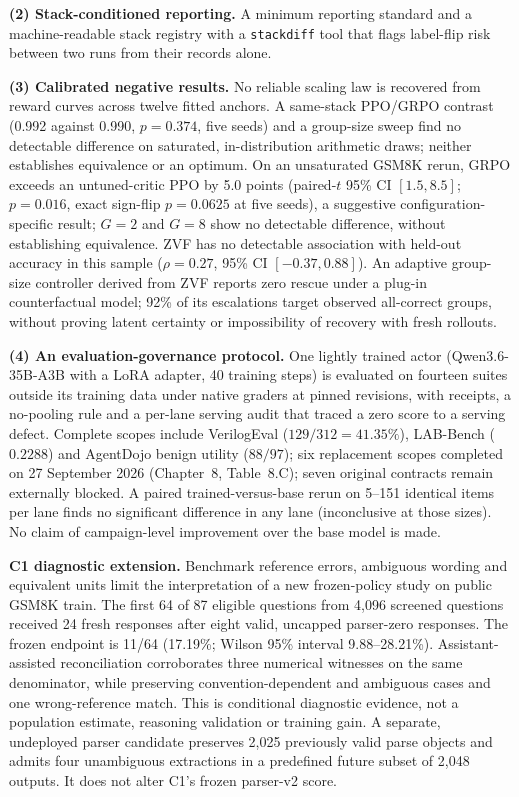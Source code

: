 \textbf{(2) Stack-conditioned reporting.} A minimum reporting standard and a
machine-readable stack registry with a \texttt{stackdiff} tool that flags
label-flip risk between two runs from their records alone.

\textbf{(3) Calibrated negative results.} No reliable scaling law is recovered
from reward curves across twelve fitted anchors. A same-stack PPO/GRPO
contrast (0.992 against 0.990, $p = 0.374$, five seeds) and a group-size sweep
find no detectable difference on saturated, in-distribution arithmetic draws;
neither establishes equivalence or an optimum. On an unsaturated GSM8K rerun, GRPO exceeds an
untuned-critic PPO by 5.0 points (paired-$t$ 95\% CI $[1.5, 8.5]$;
$p=0.016$, exact sign-flip $p=0.0625$ at five seeds), a suggestive
configuration-specific result; $G = 2$ and $G = 8$ show no detectable
difference, without establishing equivalence. ZVF has no detectable
association with held-out accuracy in this sample
($\rho = 0.27$, 95\% CI $[-0.37, 0.88]$). An adaptive group-size controller
derived from ZVF reports zero rescue under a plug-in counterfactual model;
92\% of its escalations target observed all-correct groups, without proving
latent certainty or impossibility of recovery with fresh rollouts.

\textbf{(4) An evaluation-governance protocol.} One lightly trained actor
(Qwen3.6-35B-A3B with a LoRA adapter, 40 training steps) is evaluated on
fourteen suites outside its training data under native graders at pinned revisions, with
receipts, a no-pooling rule and a per-lane serving audit that traced a
zero score to a serving defect. Complete scopes include VerilogEval
($129/312 = 41.35\%$), LAB-Bench ($0.2288$) and AgentDojo benign utility
($88/97$); six replacement scopes completed on 27 September 2026
(Chapter~8, Table~8.C); seven original contracts remain externally blocked. A
paired trained-versus-base rerun on 5--151 identical items per lane finds no
significant difference in any lane (inconclusive at those sizes). No
claim of campaign-level improvement over the base model is made.


\textbf{C1 diagnostic extension.} Benchmark reference errors, ambiguous wording and equivalent units limit the interpretation of a new frozen-policy study on public GSM8K train. The first 64 of 87 eligible questions from 4,096 screened questions received 24 fresh responses after eight valid, uncapped parser-zero responses. The frozen endpoint is 11/64 (17.19\%; Wilson 95\% interval 9.88--28.21\%). Assistant-assisted reconciliation corroborates three numerical witnesses on the same denominator, while preserving convention-dependent and ambiguous cases and one wrong-reference match. This is conditional diagnostic evidence, not a population estimate, reasoning validation or training gain. A separate, undeployed parser candidate preserves 2,025 previously valid parse objects and admits four unambiguous extractions in a predefined future subset of 2,048 outputs. It does not alter C1's frozen parser-v2 score.

